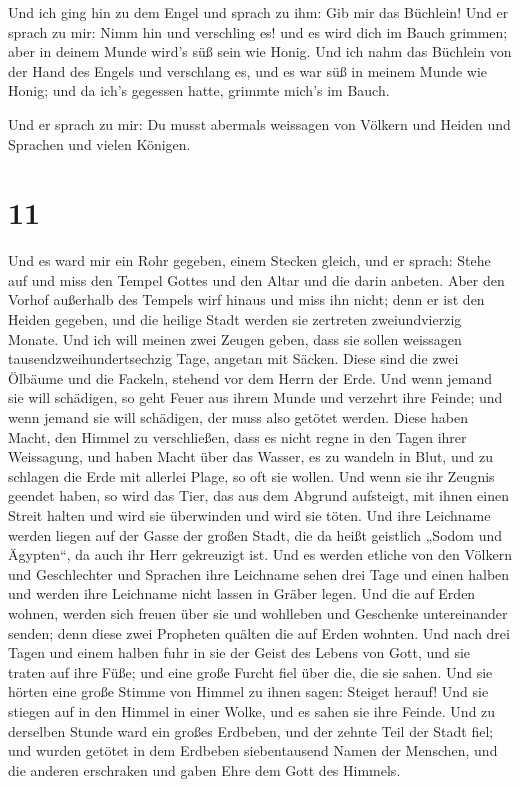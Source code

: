  Und ich ging hin zu dem Engel und sprach zu ihm: Gib mir
das Büchlein! Und er sprach zu mir: Nimm hin und verschling es! und es
wird dich im Bauch grimmen; aber in deinem Munde wird's süß sein wie
Honig.  Und ich nahm das Büchlein von der Hand des Engels
und verschlang es, und es war süß in meinem Munde wie Honig; und da
ich's gegessen hatte, grimmte mich's im Bauch.

 Und er sprach zu mir: Du musst abermals weissagen von
Völkern und Heiden und Sprachen und vielen Königen.

\hypertarget{section-10}{%
\section{11}\label{section-10}}

 Und es ward mir ein Rohr gegeben, einem Stecken gleich,
und er sprach: Stehe auf und miss den Tempel Gottes und den Altar und
die darin anbeten.  Aber den Vorhof außerhalb des Tempels
wirf hinaus und miss ihn nicht; denn er ist den Heiden gegeben, und die
heilige Stadt werden sie zertreten zweiundvierzig Monate. 
Und ich will meinen zwei Zeugen geben, dass sie sollen weissagen
tausendzweihundertsechzig Tage, angetan mit Säcken.  Diese
sind die zwei Ölbäume und die Fackeln, stehend vor dem Herrn der Erde.
 Und wenn jemand sie will schädigen, so geht Feuer aus
ihrem Munde und verzehrt ihre Feinde; und wenn jemand sie will
schädigen, der muss also getötet werden.  Diese haben
Macht, den Himmel zu verschließen, dass es nicht regne in den Tagen
ihrer Weissagung, und haben Macht über das Wasser, es zu wandeln in
Blut, und zu schlagen die Erde mit allerlei Plage, so oft sie wollen.
 Und wenn sie ihr Zeugnis geendet haben, so wird das Tier,
das aus dem Abgrund aufsteigt, mit ihnen einen Streit halten und wird
sie überwinden und wird sie töten.  Und ihre Leichname
werden liegen auf der Gasse der großen Stadt, die da heißt geistlich
„Sodom und Ägypten``, da auch ihr Herr gekreuzigt ist. 
Und es werden etliche von den Völkern und Geschlechter und Sprachen ihre
Leichname sehen drei Tage und einen halben und werden ihre Leichname
nicht lassen in Gräber legen.  Und die auf Erden wohnen,
werden sich freuen über sie und wohlleben und Geschenke untereinander
senden; denn diese zwei Propheten quälten die auf Erden wohnten.
 Und nach drei Tagen und einem halben fuhr in sie der
Geist des Lebens von Gott, und sie traten auf ihre Füße; und eine große
Furcht fiel über die, die sie sahen.  Und sie hörten eine
große Stimme von Himmel zu ihnen sagen: Steiget herauf! Und sie stiegen
auf in den Himmel in einer Wolke, und es sahen sie ihre Feinde.
 Und zu derselben Stunde ward ein großes Erdbeben, und
der zehnte Teil der Stadt fiel; und wurden getötet in dem Erdbeben
siebentausend Namen der Menschen, und die anderen erschraken und gaben
Ehre dem Gott des Himmels.

